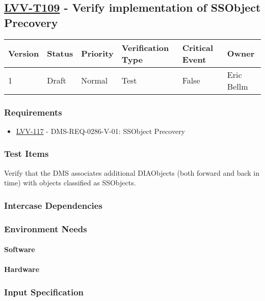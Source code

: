 \subsection{\href{https://jira.lsstcorp.org/secure/Tests.jspa\#/testCase/LVV-T109}{LVV-T109}
    - Verify implementation of SSObject Precovery}\label{lvv-t109}

\begin{longtable}[]{llllll}
\toprule
Version & Status & Priority & Verification Type & Critical Event & Owner
\\\midrule
1 & Draft & Normal &
Test & False & Eric Bellm
\\\bottomrule
\end{longtable}

\subsubsection{Requirements}
\begin{itemize}
\item \href{https://jira.lsstcorp.org/browse/LVV-117}{LVV-117} - DMS-REQ-0286-V-01: SSObject Precovery
\end{itemize}

\subsubsection{Test Items}
Verify that the DMS associates additional DIAObjects (both forward and
back in time) with objects classified as SSObjects.



\subsubsection{Intercase Dependencies}

\subsubsection{Environment Needs}

\paragraph{Software}

\paragraph{Hardware}

\subsubsection{Input Specification}

